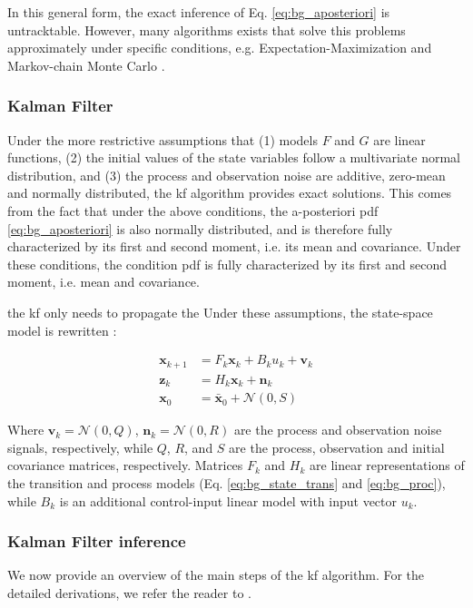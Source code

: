 In this general form, the exact inference of Eq. \ref{eq:bg_aposteriori} is untracktable.
However, many algorithms exists that solve this problems approximately under specific conditions, e.g. Expectation-Maximization \cite{dempster77} and Markov-chain Monte Carlo \cite{geyer92}.

\subsubsection{Kalman Filter}

Under the more restrictive assumptions that (1) models $F$ and $G$ are linear functions, (2) the initial values of the state variables follow a multivariate normal distribution, and (3) the process and observation noise are additive, zero-mean and normally distributed, the \gls{kf} algorithm provides exact solutions.
This comes from the fact that under the above conditions, the a-posteriori pdf \ref{eq:bg_aposteriori} is also normally distributed, and is therefore fully characterized by its first and second moment, i.e. its mean and covariance.
Under these conditions, the condition \gls{pdf} is fully characterized by its first and second moment, i.e. mean and covariance.

the \gls{kf} only needs to propagate the
Under these assumptions, the state-space model is rewritten :

\begin{align}
  \bm{x}_{k+1}&=F_{k}\bm{x}_{k} + B_{k}u_{k} + \bm{v}_{k} \label{eq:bg_state_trans_kf}\\
  \bm{z}_{k}&= H_{k}\bm{x}_{k} + \bm{n}_{k} \label{eq:bg_proc_kf} \\
  \bm{x}_{0}&= \bm{\bar{x}}_{0} + \mathcal{N}(0,S) \label{eq:bg_init_kf}
\end{align}

Where $\bm{v}_{k}=\mathcal{N}(0,Q)$, $\bm{n}_{k}=\mathcal{N}(0,R)$ are the process and observation noise signals, respectively, while $Q$, $R$, and $S$ are the process, observation and initial covariance matrices, respectively.
Matrices $F_{k}$ and $H_{k}$ are linear representations of the transition and process models (Eq. \ref{eq:bg_state_trans} and \ref{eq:bg_proc}), while $B_{k}$ is an additional control-input linear model with input vector $u_{k}$.

\subsubsection{Kalman Filter inference}
We now provide an overview of the main steps of the \gls{kf} algorithm.
For the detailed derivations, we refer the reader to \cite{thacker98}.

